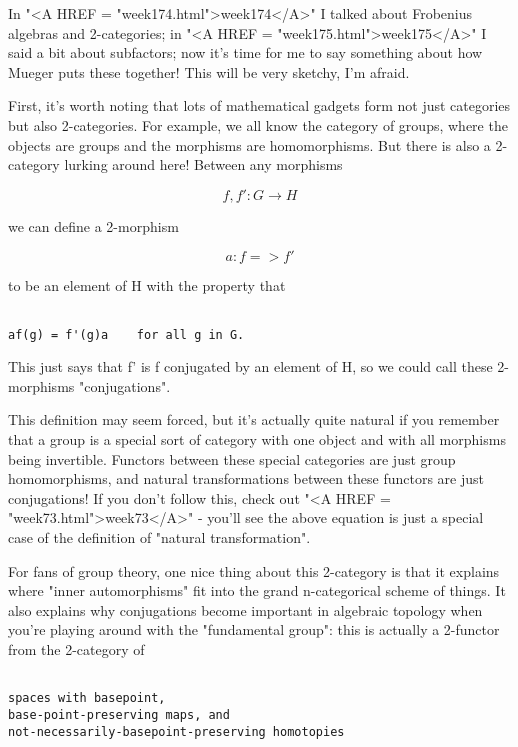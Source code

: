 In "<A HREF = "week174.html">week174</A>" I talked about Frobenius algebras and 2-categories;
in "<A HREF = "week175.html">week175</A>" I said a bit about subfactors; now it's time for me to
say something about how Mueger puts these together!   This will be 
very sketchy, I'm afraid.  

First, it's worth noting that lots of mathematical gadgets form
not just categories but also 2-categories.  For example, we all
know the category of groups, where the objects are groups and the
morphisms are homomorphisms.  But there is also a 2-category lurking
around here!  Between any morphisms 


$$

f,f': G \to  H
$$
    

we can define a 2-morphism 


$$

a: f => f'
$$
    

to be an element of H with the property that 


\begin{verbatim}

af(g) = f'(g)a    for all g in G.   
\end{verbatim}
    

This just says that f' is f conjugated by an element of H, so we
could call these 2-morphisms "conjugations".  

This definition may seem forced, but it's actually quite natural if you 
remember that a group is a special sort of category with one object and 
with all morphisms being invertible.  Functors between these special 
categories are just group homomorphisms, and natural transformations
between these functors are just conjugations!  If you don't follow this,
check out "<A HREF = "week73.html">week73</A>" - you'll see the above equation is just a special
case of the definition of "natural transformation".

For fans of group theory, one nice thing about this 2-category is that
it explains where "inner automorphisms" fit into the grand n-categorical 
scheme of things.  It also explains why conjugations become important in 
algebraic topology when you're playing around with the "fundamental group":
this is actually a 2-functor from the 2-category of


\begin{verbatim}

spaces with basepoint,
base-point-preserving maps, and
not-necessarily-basepoint-preserving homotopies
\end{verbatim}
    

